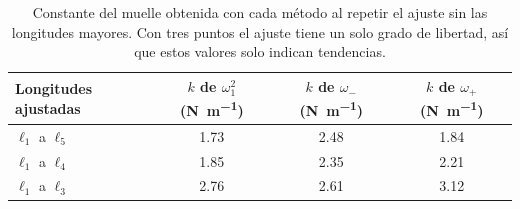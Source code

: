 
\begin{table}[ht]
\centering
\caption{Constante del muelle obtenida con cada método al repetir el ajuste sin las longitudes mayores. Con tres puntos el ajuste tiene un solo grado de libertad, así que estos valores solo indican tendencias.}
\label{tab:robustez}
\renewcommand{\arraystretch}{1.25}
\begin{tabular}{@{}l c c c@{}}
\toprule
Longitudes ajustadas & $k$ de $\omega_1^{2}$ (\si{\newton\per\meter}) & $k$ de $\omega_{-}$ (\si{\newton\per\meter}) & $k$ de $\omega_{+}$ (\si{\newton\per\meter}) \\
\midrule
$\ell_1$ a $\ell_5$ & \num{1.73} & \num{2.48} & \num{1.84} \\
$\ell_1$ a $\ell_4$ & \num{1.85} & \num{2.35} & \num{2.21} \\
$\ell_1$ a $\ell_3$ & \num{2.76} & \num{2.61} & \num{3.12} \\
\bottomrule
\end{tabular}
\end{table}
